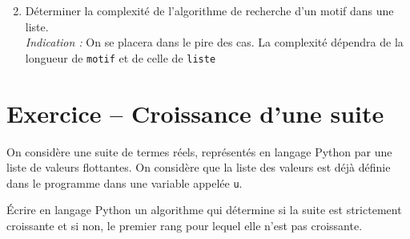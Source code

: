 \begin{enumerate}
\setcounter{enumi}{1}
\item D\' eterminer la complexit\' e de l'algorithme de recherche d'un motif dans une liste.\\
\textit{Indication :} On se placera dans le pire des cas. La complexit\' e d\' ependra de la longueur de \verb?motif? et de celle de \verb?liste?
\end{enumerate}


\section{Exercice -- Croissance d'une suite}

On considère une suite de termes réels, représentés en langage Python par une liste de valeurs flottantes. On considère que la liste des valeurs est déjà définie dans le programme dans une variable appelée \texttt{u}.

Écrire en langage Python un algorithme qui détermine si la suite est strictement croissante et si non, le premier rang pour lequel elle n'est pas croissante.



